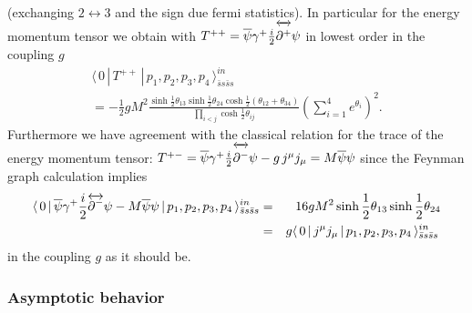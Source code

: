\documentclass[a4paper,a4paper]{article}
\begin{document}
(exchanging $2\leftrightarrow 3$ and the sign due fermi statistics). In
particular for the energy momentum tensor we obtain with $T^{++}=\overline{%
\psi }\gamma ^{+}\frac{i}{2}\overleftrightarrow{\partial ^{+}\rule%
{0in}{0.15in}}\psi $ in lowest order in the coupling $g$%
\begin{multline*}
\langle \,0\,|\,T^{++}\,|\,p_{1},p_{2},p_{3},p_{4}\,\rangle _{\bar{s}s\bar{s}%
s}^{in} \\
=-\frac{1}{2}gM^{2}\frac{\sinh \frac{1}{2}\theta _{13}\sinh \frac{1}{2}%
\theta _{24}\cosh \frac{1}{2}(\theta _{12}+\theta _{34})}{\prod_{i<j}\cosh 
\frac{1}{2}\theta _{ij}}\left( \sum_{i=1}^{4}e^{\theta _{i}}\right) ^{2}.
\end{multline*}
Furthermore we have agreement with the classical relation for the trace of
the energy momentum tensor: $T^{+-}=\overline{\psi }\gamma ^{+}\frac{i}{2}%
\overleftrightarrow{\partial ^{-}\rule{0in}{0.15in}}\psi -g\,j^{\mu }j_{\mu
}=M\overline{\psi }\psi $ since the Feynman graph calculation implies 
\begin{eqnarray*}
\langle \,0\,|\,\overline{\psi }\gamma ^{+}\frac{i}{2}\overleftrightarrow{%
\partial ^{-}}\psi -M\overline{\psi }\psi
\,|\,p_{1},p_{2},p_{3},p_{4}\,\rangle _{\bar{s}s\bar{s}s}^{in}
&=&16gM^{2}\sinh \frac{1}{2}\theta _{13}\sinh \frac{1}{2}\theta _{24} \\
&=&g\langle \,0\,|\,j^{\mu }j_{\mu }\,|\,p_{1},p_{2},p_{3},p_{4}\,\rangle _{%
\bar{s}s\bar{s}s}^{in}\,
\end{eqnarray*}
in the coupling $g$ as it should be.

\subsubsection{Asymptotic behavior}
\end{document}
